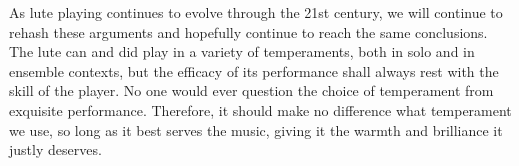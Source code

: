 As lute playing continues to evolve through the 21st century, we will continue to
rehash these arguments and hopefully continue to reach the same conclusions. The lute
can and did play in a variety of temperaments, both in solo and in ensemble contexts,
but the efficacy of its performance shall always rest with the skill of the player. No
one would ever question the choice of temperament from exquisite performance.
Therefore, it should make no difference what temperament we use, so long as it best
serves the music, giving it the warmth and brilliance it justly deserves.